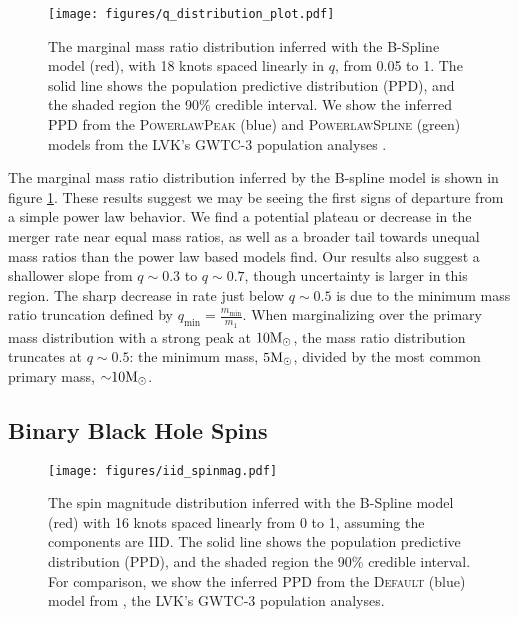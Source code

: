 \begin{figure}[hb!]
    \texttt{[image: figures/q\_distribution\_plot.pdf]}
    \caption{The marginal mass ratio distribution inferred with the B-Spline model (red), with 18 knots spaced linearly in $q$, from 0.05 to 1. The solid line shows the population predictive distribution (PPD), and the shaded region the 90\% credible interval. 
    We show the inferred PPD from the \textsc{PowerlawPeak} (blue) and \textsc{PowerlawSpline} (green) models from the LVK's GWTC-3 population analyses \citep{o3b_astro_dist}.}
    \label{fig:q_distribution}
\end{figure}

The marginal mass ratio distribution inferred by the B-spline model is shown in figure \ref{fig:q_distribution}.  These results suggest we may be seeing the first signs of departure from a simple power law behavior.  We find a potential plateau or decrease in the merger rate near equal mass ratios, as well as a broader tail towards unequal mass ratios 
than the power law based models find. Our results also suggest a shallower slope from $q\sim0.3$ to $q\sim0.7$, though uncertainty is larger in this region. The sharp decrease in rate just below 
$q\sim0.5$ is due to the minimum mass ratio truncation defined by $q_\mathrm{min}=\frac{m_\mathrm{min}}{m_1}$. When marginalizing over the primary mass 
distribution with a strong peak at $10{\rm M}_\odot$, the mass ratio distribution truncates at $q\sim0.5$: the minimum mass, $5{\rm M}_\odot$, 
divided by the most common primary mass, ${\sim}10{\rm M}_\odot$. 


\subsection{Binary Black Hole Spins} \label{sec:spin_dist}

\begin{figure}[ht!]
    \begin{centering}    
        \texttt{[image: figures/iid\_spinmag.pdf]}
        \caption{The spin magnitude distribution inferred with the B-Spline model (red) with 16 knots spaced linearly from 0 to 1, assuming the components are IID. The solid line shows the population predictive distribution (PPD), and the shaded region the 90\% credible interval. 
        For comparison, we show the inferred PPD from the \textsc{Default} (blue) model from \citet{o3b_astro_dist}, the LVK's GWTC-3 population analyses.}
        \label{fig:iid_spinmag_dist}
    \end{centering}
\end{figure}

